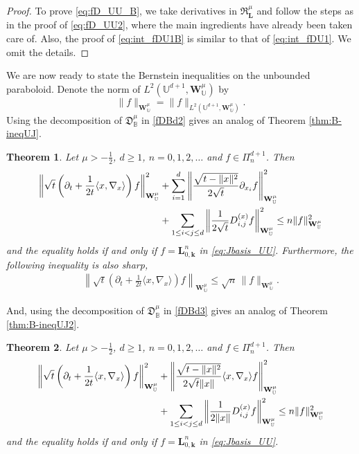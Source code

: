 \documentclass{amsart}
\newtheorem{thm}{Theorem}[section]
\theoremstyle{remark}
\def\la{{\langle}}
\def\ra{{\rangle}}
\def\fD{{\mathfrak D}}
\def\fR{{\mathfrak R}}
\def\la{{\langle}}
\def\ra{{\rangle}}
\def\kb{{\mathbf k}}
\def\Lb{{\mathbf L}}
\def\Wb{{\mathbf W}}
\def\BB{{\mathbb B}}
\def\UU{{\mathbb U}}
\def\f{\frac}
\begin{document}
\begin{proof}
To prove \eqref{eq:fD_UU_B}, we take derivatives in $\fR_\Lb^\mu$ and follow the steps as in the proof 
of \eqref{eq:fD_UU2}, where the main ingredients have already been taken care of. Also, the proof
of \eqref{eq:int_fDU1B} is similar to that of \eqref{eq:int_fDU1}. We omit the details. 
\end{proof}

We are now ready to state the Bernstein inequalities on the unbounded paraboloid. Denote the norm
of $L^2(\UU^{d+1}, \Wb_\UU^\mu)$ by 
$$
   \|f\|_{\Wb_\UU^\mu} =  \|f\|_{L^2(\UU^{d+1}, \Wb_\UU^\mu)}. 
$$
Using the decomposition of $\fD_\BB^\mu$ in \eqref{fDBd2} gives an analog of Theorem \ref{thm:B-ineqUJ}.

\begin{thm} \label{thm:B-ineqUL}
Let $\mu > -\f12$, $d \ge 1$, $n = 0,1,2,\ldots$ and $f \in \Pi_n^{d+1}$. Then
\begin{align} \label{eq:U-ineqL1}
 \left\| \sqrt{ t} \left( \partial_t + \frac{1}{2t} \la x ,\nabla_x\ra \right) f\right \|_{\Wb_{\UU}^{\mu}}^2 
   & +  \sum_{i=1}^d \left \| \f{\sqrt{t-\|x\|^2}}{2 \sqrt{t}} \partial_{x_i} f \right \|_{\Wb_{\UU}^{\mu}}^2 \\
  & +  \sum_{1\le i<j\le d} \left \| \frac{1}{2 \sqrt{t}}  D_{i, j}^{(x)} f \right \|_{\Wb_{\UU}^{\mu}}^2
       \le n  \|f \|_{\Wb_{\UU}^{\mu}}^2 \notag
\end{align} 
and the equality holds if and only if $f= \Lb_{0,\kb}^n$ in \eqref{eq:Jbasis_UU}. 
Furthermore, the following inequality is also sharp, 
\begin{align}\label{eq:U-ineqL2}
\left\| \sqrt{ t}\left( \partial_t + \frac{1}{2t} \la x ,\nabla_x\ra \right) f\right \|_{\Wb_{\UU}^{\mu}} \le \sqrt{n} \, \|f \|_{\Wb_{\UU}^{\mu}}.
\end{align}
\end{thm}

And, using the decomposition of $\fD_\BB^\mu$ in \eqref{fDBd3} gives an analog of Theorem \ref{thm:B-ineqUJ2}. 

\begin{thm} \label{thm:B-ineqUL2}
Let $\mu> -\f12$, $d \ge 1$, $n = 0,1,2,\ldots$ and $f \in \Pi_n^{d+1}$. Then
\begin{align} \label{eq:U-ineqLB}
 \left\| \sqrt{t}  \left( \partial_t + \frac{1}{2t} \la x ,\nabla_x\ra \right) f\right \|_{\Wb_{\UU}^{\mu}}^2 & +
  \left\| \frac{ \sqrt{t-\|x\|^2} }{2 \sqrt{t} \|x\|} \la x ,\nabla_x\ra f \right \|_{\Wb_{\UU}^{\mu}}^2  \\
 & %
  +  \sum_{1\le i<j\le d} \left \| \frac{1}{2 \|x\|}  D_{i, j}^{(x)} f \right \|_{\Wb_{\UU}^{\mu}}^2
       \le n \|f \|_{\Wb_{\UU}^{\mu}}^2 \notag
\end{align} 
and the equality holds if and only if $f= \Lb_{0,\kb}^n$ in \eqref{eq:Jbasis_UU}. 
\end{thm}
\end{document}
